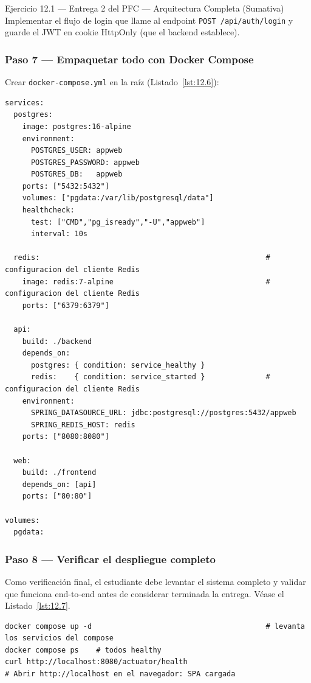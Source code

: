 \documentclass[11pt,a4paper,openany]{book}
\begin{document}
\begin{cajaejercicio}{Ejercicio 12.1 --- Entrega 2 del PFC --- Arquitectura Completa (Sumativa)}
Implementar el flujo de login que llame al endpoint
\texttt{POST /api/auth/login} y guarde el JWT en cookie HttpOnly
(que el backend establece).

\subsubsection*{Paso 7 --- Empaquetar todo con Docker Compose}

Crear \texttt{docker-compose.yml} en la raíz (Listado~\ref{lst:12.6}):

\begin{lstlisting}[style=yaml,numbers=none,caption={Ejemplo de YAML},label=lst:12.6]
services:
  postgres:
    image: postgres:16-alpine
    environment:
      POSTGRES_USER: appweb
      POSTGRES_PASSWORD: appweb
      POSTGRES_DB:   appweb
    ports: ["5432:5432"]
    volumes: ["pgdata:/var/lib/postgresql/data"]
    healthcheck:
      test: ["CMD","pg_isready","-U","appweb"]
      interval: 10s

  redis:                                                    # configuracion del cliente Redis
    image: redis:7-alpine                                   # configuracion del cliente Redis
    ports: ["6379:6379"]

  api:
    build: ./backend
    depends_on:
      postgres: { condition: service_healthy }
      redis:    { condition: service_started }              # configuracion del cliente Redis
    environment:
      SPRING_DATASOURCE_URL: jdbc:postgresql://postgres:5432/appweb
      SPRING_REDIS_HOST: redis
    ports: ["8080:8080"]

  web:
    build: ./frontend
    depends_on: [api]
    ports: ["80:80"]

volumes:
  pgdata:
\end{lstlisting}

\subsubsection*{Paso 8 --- Verificar el despliegue completo}

Como verificación final, el estudiante debe levantar el
sistema completo y validar que funciona end-to-end antes de
considerar terminada la entrega. V\'ease el Listado~\ref{lst:12.7}.


\begin{lstlisting}[style=shell,numbers=none,caption={Ejemplo de Shell},label=lst:12.7]
docker compose up -d                                        # levanta los servicios del compose
docker compose ps    # todos healthy
curl http://localhost:8080/actuator/health
# Abrir http://localhost en el navegador: SPA cargada
\end{lstlisting}


\end{cajaejercicio}
\end{document}
